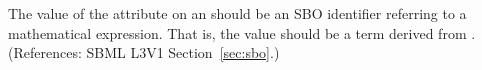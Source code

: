 The value of the  attribute on an \InitialAssignment should be an
SBO identifier referring to a mathematical expression.  That is, the value
should be a term derived from \sbomathformula.  (References: SBML
L3V1 Section~\ref{sec:sbo}.)
